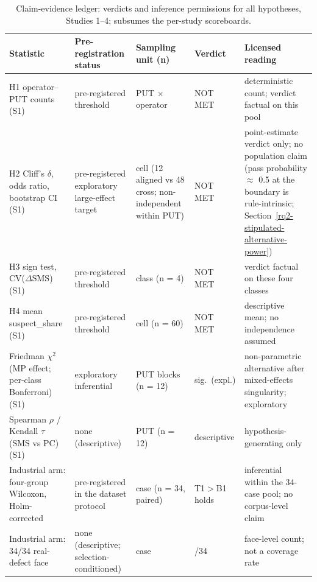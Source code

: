 \documentclass[manuscript,screen,review]{acmart}
\begin{document}
{%
\scriptsize
\begin{longtable}[]{@{}
  >{\raggedright\arraybackslash}p{}
  >{\raggedright\arraybackslash}p{}
  >{\raggedright\arraybackslash}p{}
  >{\raggedright\arraybackslash}p{}
  >{\raggedright\arraybackslash}p{}@{}}
\caption{Claim-evidence ledger: verdicts and inference permissions for all
hypotheses, Studies 1--4; subsumes the per-study
scoreboards.}\label{tab:inference-permissions}\\
\toprule\noalign{}
Statistic & Pre-registration status & Sampling unit (n) & Verdict & Licensed reading \\
\midrule\noalign{}
\endfirsthead
\endhead
\bottomrule\noalign{}
\endlastfoot
H1 operator--PUT counts (S1) & pre-registered threshold & PUT $\times$
operator & NOT MET & deterministic count; verdict factual on this pool \\
H2 Cliff's $\delta$, odds ratio, bootstrap CI (S1) & pre-registered
exploratory large-effect target & cell (12 aligned vs 48 cross;
non-independent within PUT) & NOT MET & point-estimate verdict only; no
population claim (pass probability $\approx$ 0.5 at the boundary is
rule-intrinsic; Section~\ref{rq2-stipulated-alternative-power}) \\
H3 sign test, CV($\Delta$SMS) (S1) & pre-registered threshold & class (n = 4)
& NOT MET & verdict factual on these four classes \\
H4 mean suspect\_share (S1) & pre-registered threshold & cell (n = 60) &
NOT MET & descriptive mean; no independence assumed \\
Friedman $\chi^2$ (MP effect; per-class Bonferroni) (S1) & exploratory
inferential & PUT blocks (n = 12) & sig.\ (expl.) & non-parametric alternative after
mixed-effects singularity; exploratory \\
Spearman $\rho$ / Kendall $\tau$ (SMS vs PC) (S1) & none (descriptive) & PUT
(n = 12) & descriptive & hypothesis-generating only \\
Industrial arm: four-group Wilcoxon, Holm-corrected & pre-registered in
the dataset protocol & case (n = 34, paired) & T1$>$B1 holds & inferential within the
34-case pool; no corpus-level claim \\
Industrial arm: 34/34 real-defect face & none (descriptive; selection-conditioned) & case &
34/34 & face-level count; not a coverage rate \\

\end{longtable}}
\end{document}
